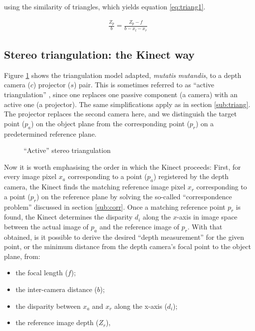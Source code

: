 using the similarity of triangles, which yields equation
\ref{eq:triang1}.

\begin{align} \label{eq:triang1}
    \frac{Z_p}{b} = \frac{Z_p - f}{b - x_l - x_r}
\end{align}


\subsection{Stereo triangulation: the Kinect way}

Figure \ref{fig:atriang} shows the triangulation model adapted, \emph{mutatis
mutandis}, to a depth camera ($c$) projector ($s$) pair. This is sometimes
referred to as ``active triangulation'' \cite{alexander1987}, since one replaces
one passive component (a camera) with an active one (a projector). The same
simplifications apply as in section \ref{sub:triang}. The projector replaces the
second camera here, and we distinguish the target point ($p_a$) on the object
plane from the corresponding point ($p_r$) on a predetermined reference plane.

\begin{figure}[ht]
    \begin{center}
        
        \caption{``Active'' stereo triangulation}
        \label{fig:atriang}
    \end{center}
\end{figure}

Now it is worth emphasising the order in which the Kinect proceeds: First, for
every image pixel $x_a$ corresponding to a point ($p_a$) registered by the depth
camera, the Kinect finds the matching reference image pixel $x_r$ corresponding
to a point ($p_r$) on the reference plane by solving the so-called
``correspondence problem'' discussed in section \ref{sub:corr}. Once a matching
reference point $p_r$ is found, the Kinect determines the disparity $d_i$ along
the $x$-axis in image space between the actual image of $p_a$ and the reference
image of $p_r$. With that obtained, is it possible to derive the desired ``depth
measurement'' for the given point, or the minimum distance from the depth
camera's focal point to the object plane, from: 

\begin{itemize}

    \item the focal length ($f$);

    \item the inter-camera distance ($b$);

    \item the disparity between $x_a$ and $x_r$ along the x-axis ($d_i$);

    \item the reference image depth ($Z_r$),

\end{itemize}

